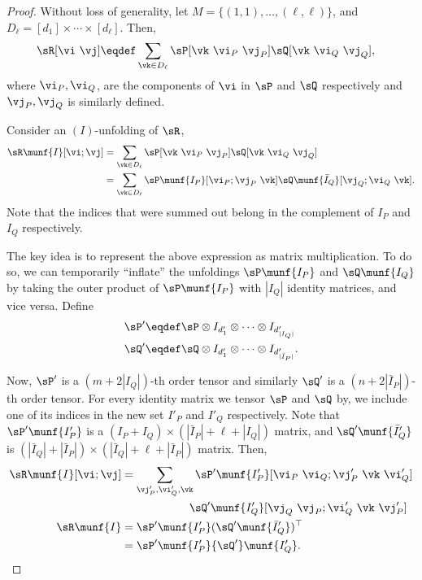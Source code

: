 \begin{proof}
  Without loss of generality, let $M = \{(1,1), \ldots, (\ell,\ell)\}$,
  and $D_\ell = [d_1] \times \cdots \times [d_\ell]$. 
  Then, 
  \begin{align*}
    \sR[\vi\ \vj] &\eqdef \sum_{\vk \in D_\ell} \sP[\vk\ \vi_P\ \vj_P] \sQ[\vk\ \vi_Q\ \vj_Q],
  \end{align*}
  where $\vi_P, \vi_Q$, are the components of $\vi$ in $\sP$ and $\sQ$
  respectively and $\vj_P, \vj_Q$ is similarly defined.

Consider an $(I)$-unfolding of $\sR$,
  \begin{align*}
    \sR\munf{I}[\vi;\vj] 
       &= \sum_{\vk \in D_\ell} \sP[\vk\  \vi_P \  \vj_P] \sQ[\vk\  \vi_Q \  \vj_Q] \\
       &= \sum_{\vk \in D_\ell} \sP\munf{I_P}[\vi_P; \vj_P \  \vk] \sQ\munf{\bar I_Q}[\vj_Q ; \vi_Q \  \vk].
  \end{align*}
Note that the indices that were summed out belong in the complement of
$I_P$ and $I_Q$ respectively.

The key idea is to represent the above expression as matrix multiplication.
To do so, we can temporarily ``inflate'' the unfoldings $\sP\munf{I_P}$
  and $\sQ\munf{I_Q}$ by taking the outer product of $\sP\munf{I_P}$ with
  $|I_Q|$ identity matrices, and vice versa. Define 
\begin{align*}
  \sP' &\eqdef \sP \otimes I_{d'_1} \otimes \cdots \otimes I_{d'_{|I_Q|}} \\
  \sQ' &\eqdef \sQ \otimes I_{d'_1} \otimes \cdots \otimes I_{d'_{|\bar I_P|}}.
\end{align*}

Now, $\sP'$ is a $(m + 2 |I_Q|)$-th order tensor and similarly $\sQ'$
  is a $(n + 2 |\bar I_P|)$-th order tensor. 
For every identity matrix we tensor $\sP$ and $\sQ$ by, we include one of
  its indices in the new set $I'_P$ and $I'_Q$ respectively.
Note that ${\sP'}\munf{I'_P}$ is a $(I_P + I_Q)\times (|\bar I_P| + \ell
  + |I_Q|)$ matrix, and ${\sQ'}\munf{\bar I'_Q}$ is $(|\bar I_Q| + |\bar
  I_P|) \times (|\bar I_Q| + \ell + |\bar I_P|)$ matrix.
Then,
\begin{align*}
    \sR\munf{I}[\vi;\vj] 
    &= \sum_{\vj'_P, \vi'_Q, \vk}
    {\sP'}\munf{I'_P}[\vi_P \  \vi_Q; \vj'_P \  \vk \  \vi'_Q ]  \\ 
    &\quad \hphantom{\sum_{\be_P, \be_Q, \vk}}
    {\sQ'}\munf{I'_Q}[\vj_Q \  \vj_P; \vi'_Q \  \vk \  \vj'_P ] \\
    \sR\munf{I} &= {\sP'}\munf{I'_P} ({\sQ'}\munf{\bar I'_Q})^\top \\
                &= {\sP'}\munf{I'_P} {\sQ'}\munf{I'_Q}.
\end{align*}


\end{proof}
